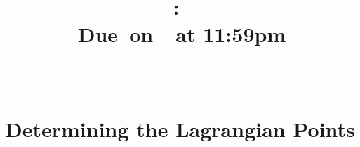 \documentclass{article}
\title{
    \vspace{2in}
    \textmd{\textbf{\hmwkClass:\ \hmwkTitle}}\\
    \normalsize\vspace{0.1in}\small{Due\ on\ \hmwkDueDate\ at 11:59pm}\\
    \vspace{0.1in}\large{\textit{\hmwkClassInstructor\ \hmwkClassTime}}
    \vspace{3in}
}
\author{\hmwkAuthorName}
\date{}
\begin{document}
\color{white}

\maketitle

\pagebreak


\section{Determining the Lagrangian Points}
\end{document}
